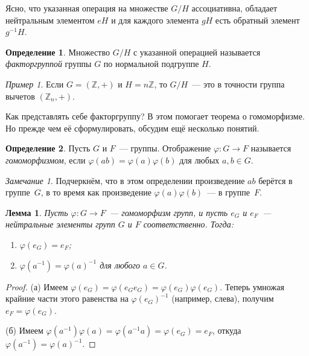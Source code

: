 \documentclass[a4paper,10pt]{amsart}
\def\ZZ{{\mathbb Z}}%
\newtheorem{lemma}{Лемма}
\theoremstyle{definition}
\newtheorem{definition}{Определение}
\theoremstyle{remark}
\newtheorem{remark}{Замечание}
\newtheorem{example}{Пример}
\begin{document}
Ясно, что указанная операция на множестве $G/H$ ассоциативна,
обладает нейтральным элементом $eH$ и для каждого элемента $gH$ есть
обратный элемент $g^{-1}H$.

\begin{definition}
Множество $G/H$ с указанной операцией называется {\it факторгруппой}
группы $G$ по нормальной подгруппе $H$.
\end{definition}

\begin{example}
Если $G=(\ZZ,+)$ и $H=n\ZZ$, то $G/H$~--- это в точности группа
вычетов $(\ZZ_n,+)$.
\end{example}

Как представлять себе факторгруппу? В этом помогает теорема о
гомоморфизме. Но прежде чем её сформулировать, обсудим ещё несколько
понятий.

\begin{definition}
Пусть $G$ и $F$~--- группы. Отображение $\varphi\colon G\to F$
называется {\it гомоморфизмом}, если
$\varphi(ab)=\varphi(a)\varphi(b)$ для любых $a,b\in G$.
\end{definition}

\begin{remark}
Подчеркнём, что в этом определении произведение $ab$ берётся в
группе~$G$, в то время как произведение $\varphi(a) \varphi(b)$~---
в группе~$F$.
\end{remark}

\begin{lemma}
Пусть $\varphi \colon G \to F$~--- гомоморфизм групп, и пусть $e_G$
и $e_F$~--- нейтральные элементы групп $G$ и $F$ соответственно.
Тогда:

\vspace{-2mm}
\begin{enumerate}
\item[(а)]
$\varphi(e_G) = e_F$;

\item[(б)]
$\varphi(a^{-1})=\varphi(a)^{-1}$ для любого $a\in G$.
\end{enumerate}
\end{lemma}

\vspace{-5mm}

\begin{proof}
(а) Имеем $\varphi(e_G)=\varphi(e_Ge_G)=\varphi(e_G)\varphi(e_G)$.
Теперь умножая крайние части этого равенства на $\varphi(e_G)^{-1}$
(например, слева), получим $e_F = \varphi(e_G)$.

(б) Имеем $\varphi(a^{-1}) \varphi(a) = \varphi(a^{-1}a) =
\varphi(e_G) = e_F$, откуда $\varphi(a^{-1}) = \varphi(a)^{-1}$.
\end{proof}
\end{document}
